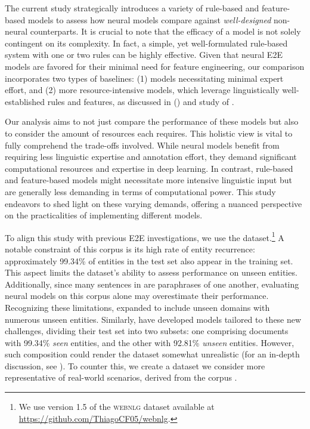 The current study strategically introduces a variety of rule-based and feature-based models to assess how neural models compare against \textit{well-designed} non-neural counterparts. It is crucial to note that the efficacy of a model is not solely contingent on its complexity. In fact, a simple, yet well-formulated rule-based system with one or two rules can be highly effective. Given that neural E2E models are favored for their minimal need for feature engineering, our comparison incorporates two types of baselines: (1) models necessitating minimal expert effort, and (2) more resource-intensive models, which leverage linguistically well-established rules and features, as discussed in  () and study \studB of .

Our analysis aims to not just compare the performance of these models but also to consider the amount of resources each requires. This holistic view is vital to fully comprehend the trade-offs involved. While neural models benefit from requiring less linguistic expertise and annotation effort, they demand significant computational resources and expertise in deep learning. In contrast, rule-based and feature-based models might necessitate more intensive linguistic input but are generally less demanding in terms of computational power. This study endeavors to shed light on these varying demands, offering a nuanced perspective on the practicalities of implementing different \context models.

To align this study with previous E2E \context investigations, we use the \webnlg dataset.\footnote{We use version 1.5 of the \textsc{webnlg} dataset available at \url{https://github.com/ThiagoCF05/webnlg}.} A notable constraint of this corpus is its high rate of entity recurrence: approximately 99.34\% of entities in the test set also appear in the training set. This aspect limits the dataset’s ability to assess performance on unseen entities. Additionally, since many sentences in \webnlg are paraphrases of one another, evaluating neural models on this corpus alone may overestimate their performance. Recognizing these limitations, \citet{castro-ferreira-etal-2019-neural} expanded \webnlg to include unseen domains with numerous unseen entities. Similarly, \citet{cunha-etal-2020-referring} have developed models tailored to these new challenges, dividing their test set into two subsets: one comprising documents with 99.34\% {\em seen} entities, and the other with 92.81\% {\em unseen} entities. However, such composition could render the dataset somewhat unrealistic (for an in-depth discussion, see ). To counter this, we create a dataset we consider more representative of real-world scenarios, derived from the \wsj corpus \citep{hovy-etal-2006-ontonotes,weischedel2013ontonotes}. 

